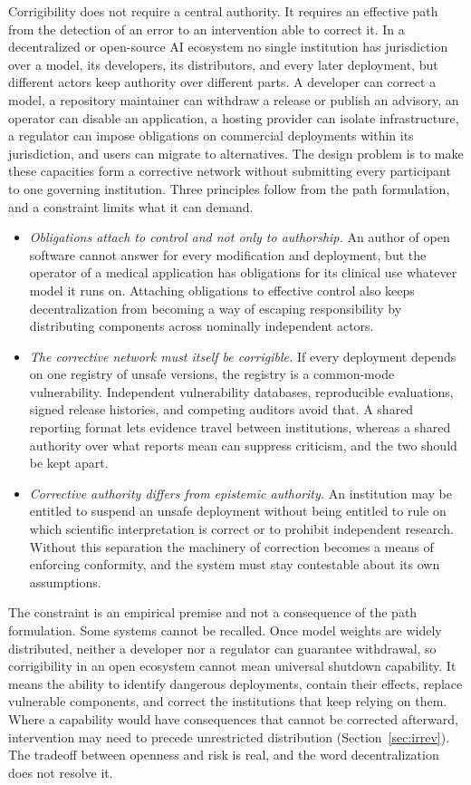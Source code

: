 \documentclass[11pt]{article}
\begin{document}
Corrigibility does not require a central authority. It requires an effective path from the detection of an error to an intervention able to correct it. In a decentralized or open-source AI ecosystem no single institution has jurisdiction over a model, its developers, its distributors, and every later deployment, but different actors keep authority over different parts. A developer can correct a model, a repository maintainer can withdraw a release or publish an advisory, an operator can disable an application, a hosting provider can isolate infrastructure, a regulator can impose obligations on commercial deployments within its jurisdiction, and users can migrate to alternatives. The design problem is to make these capacities form a corrective network without submitting every participant to one governing institution. Three principles follow from the path formulation, and a constraint limits what it can demand.
\begin{itemize}
\item \emph{Obligations attach to control and not only to authorship.} An author of open software cannot answer for every modification and deployment, but the operator of a medical application has obligations for its clinical use whatever model it runs on. Attaching obligations to effective control also keeps decentralization from becoming a way of escaping responsibility by distributing components across nominally independent actors.
\item \emph{The corrective network must itself be corrigible.} If every deployment depends on one registry of unsafe versions, the registry is a common-mode vulnerability. Independent vulnerability databases, reproducible evaluations, signed release histories, and competing auditors avoid that. A shared reporting format lets evidence travel between institutions, whereas a shared authority over what reports mean can suppress criticism, and the two should be kept apart.
\item \emph{Corrective authority differs from epistemic authority.} An institution may be entitled to suspend an unsafe deployment without being entitled to rule on which scientific interpretation is correct or to prohibit independent research. Without this separation the machinery of correction becomes a means of enforcing conformity, and the system must stay contestable about its own assumptions.
\end{itemize}

The constraint is an empirical premise and not a consequence of the path formulation. Some systems cannot be recalled. Once model weights are widely distributed, neither a developer nor a regulator can guarantee withdrawal, so corrigibility in an open ecosystem cannot mean universal shutdown capability. It means the ability to identify dangerous deployments, contain their effects, replace vulnerable components, and correct the institutions that keep relying on them. Where a capability would have consequences that cannot be corrected afterward, intervention may need to precede unrestricted distribution (Section~\ref{sec:irrev}). The tradeoff between openness and risk is real, and the word decentralization does not resolve it.
\end{document}
